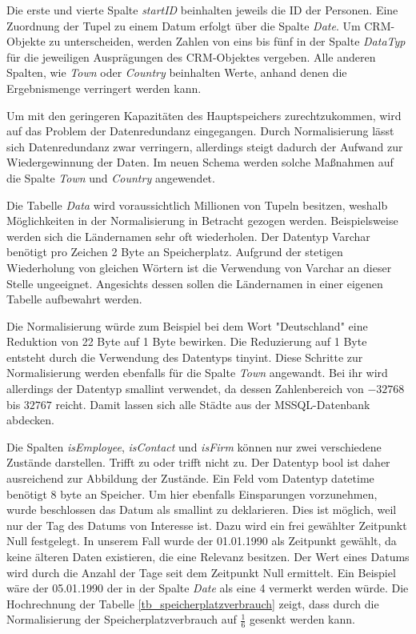 Die erste und vierte Spalte \textit{startID} beinhalten jeweils die ID der Personen. Eine Zuordnung der Tupel zu einem Datum erfolgt über die Spalte \textit{Date}. Um CRM-Objekte zu unterscheiden, werden Zahlen von eins bis fünf in der Spalte \textit{DataTyp} für die jeweiligen Ausprägungen des CRM-Objektes vergeben. Alle anderen Spalten, wie \textit{Town} oder \textit{Country} beinhalten Werte, anhand denen die Ergebnismenge verringert werden kann. 

Um mit den geringeren Kapazitäten des Hauptspeichers zurechtzukommen, wird auf das Problem der Datenredundanz eingegangen. Durch Normalisierung lässt sich Datenredundanz zwar verringern, allerdings steigt dadurch der Aufwand zur Wiedergewinnung der Daten. Im neuen Schema werden solche Maßnahmen auf die Spalte \textit{Town} und \textit{Country} angewendet. 

Die Tabelle \textit{Data} wird voraussichtlich Millionen von Tupeln besitzen, weshalb Möglichkeiten in der Normalisierung in Betracht gezogen werden. Beispielsweise werden sich die Ländernamen sehr oft wiederholen. Der Datentyp Varchar benötigt pro Zeichen 2 Byte an Speicherplatz. Aufgrund der stetigen Wiederholung von gleichen Wörtern ist die Verwendung von Varchar an dieser Stelle ungeeignet. Angesichts dessen sollen die Ländernamen in einer eigenen Tabelle aufbewahrt werden. 

Die Normalisierung würde zum Beispiel bei dem Wort "Deutschland" eine Reduktion von 22 Byte auf 1 Byte bewirken. Die Reduzierung auf 1 Byte entsteht durch die Verwendung des Datentyps tinyint. Diese Schritte zur Normalisierung werden ebenfalls für die Spalte \textit{Town} angewandt. Bei ihr wird allerdings der Datentyp smallint verwendet, da dessen Zahlenbereich von $-32768$ bis $32767$ reicht. Damit lassen sich alle Städte aus der MSSQL-Datenbank abdecken. 

Die Spalten \textit{isEmployee}, \textit{isContact} und \textit{isFirm} können nur zwei verschiedene Zustände darstellen. Trifft zu oder trifft nicht zu. Der Datentyp bool ist daher ausreichend zur Abbildung der  Zustände. Ein Feld vom Datentyp datetime benötigt 8 byte an Speicher. Um hier ebenfalls Einsparungen vorzunehmen, wurde beschlossen das Datum als smallint zu deklarieren. Dies ist möglich, weil nur der Tag des Datums von Interesse ist. Dazu wird ein frei gewählter Zeitpunkt Null festgelegt. In unserem Fall wurde der 01.01.1990 als Zeitpunkt gewählt, da keine älteren Daten existieren, die eine Relevanz besitzen. Der Wert eines Datums wird durch die Anzahl der Tage seit dem Zeitpunkt Null ermittelt. Ein Beispiel wäre der 05.01.1990 der in der Spalte \textit{Date} als eine 4 vermerkt werden würde. Die Hochrechnung der Tabelle \ref{tb_speicherplatzverbrauch} zeigt, dass durch die Normalisierung der Speicherplatzverbrauch auf $ \frac{1}{6} $ gesenkt werden kann.

